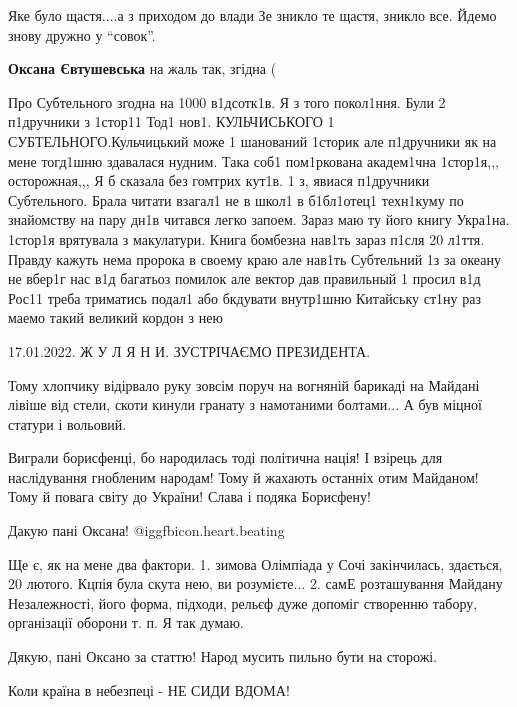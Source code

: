 \begin{itemize}

Яке було щастя....а з приходом до влади Зе зникло те щастя, зникло все. Йдемо знову дружно у \enquote{совок}.

\textbf{Оксана Євтушевська} на жаль так, згідна (


Про Субтельного згодна на 1000 в1дсотк1в. Я з того покол1ння. Були 2 п1дручники
з 1стор11 Тод1 нов1. КУЛЬЧИСЬКОГО 1 СУБТЕЛЬНОГО.Кульчицький може 1 шанований
1сторик але п1дручники як на мене тогд1шню здавалася нудним. Така соб1
пом1ркована академ1чна 1стор1я,,, осторожная,,, Я б сказала без гомтрих кут1в.
1 з, явиася п1дручники Субтельного. Брала читати взагал1 не в школ1 в
б1бл1отец1 техн1куму по знайомству на пару дн1в читався легко запоем. Зараз маю
ту його книгу Укра1на. 1стор1я врятувала з макулатури. Книга бомбезна нав1ть
зараз п1сля 20 л1ття. Правду кажуть нема пророка в своему краю але нав1ть
Субтельний 1з за океану не вбер1г нас в1д багатьоз помилок але вектор дав
правильный 1 просил в1д Рос11 треба триматись подал1 або бкдувати внутр1шню
Китайську ст1ну раз маемо такий великий кордон з нею

17.01.2022. Ж У Л Я Н И. ЗУСТРІЧАЄМО ПРЕЗИДЕНТА.


Тому хлопчику відірвало руку зовсім поруч на вогняній барикаді на Майдані
лівіше від стели, скоти кинули гранату з намотаними болтами... А був міцної
статури і вольовий.


Виграли борисфенці, бо народилась тоді політична нація! І взірець для
наслідування гнобленим народам! Тому й жахають останніх отим Майданом! Тому й
повага світу до України! Слава і подяка Борисфену!

Дакую пані Оксана! @igg{fbicon.heart.beating} 


Ще є, як на мене два фактори. 1. зимова Олімпіада у Сочі закінчилась, здається, 20
лютого. Кцпія була скута нею, ви розумієте... 2. самЕ розташування Майдану
Незалежності, його форма, підходи, рельєф дуже допоміг створенню табору,
організації оборони т. п. Я так думаю.

Дякую, пані Оксано за статтю! Народ мусить пильно бути на сторожі.

Коли країна в небезпеці - НЕ СИДИ ВДОМА!


\end{itemize}
